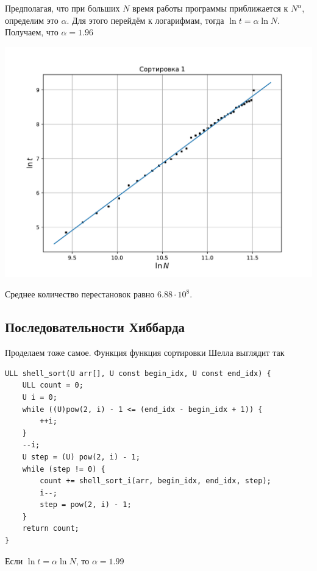 \documentclass[a4paper,12pt]{article}
\begin{document}
Предполагая, что при больших $N$ время работы программы приближается к $N^{\alpha}$, определим это $\alpha$. Для этого перейдём к логарифмам, тогда $\ln t = \alpha \ln N$. Получаем, что $\alpha = 1.96$

\begin{center}
\includegraphics[scale=0.6]{Figure_2.pdf}
\end{center}

Среднее количество перестановок равно $6.88 \cdot 10^8$.

\subsection*{Последовательности Хиббарда}
Проделаем тоже самое. Функция функция сортировки Шелла выглядит так
\begin{lstlisting}
ULL shell_sort(U arr[], U const begin_idx, U const end_idx) {
    ULL count = 0;
    U i = 0;
    while ((U)pow(2, i) - 1 <= (end_idx - begin_idx + 1)) {
        ++i;
    } 
    --i;
    U step = (U) pow(2, i) - 1;
    while (step != 0) {
        count += shell_sort_i(arr, begin_idx, end_idx, step);
        i--;
        step = pow(2, i) - 1;
    }
    return count;
}
\end{lstlisting}

Если $\ln t = \alpha \ln N$, то $\alpha = 1.99$
\end{document}

